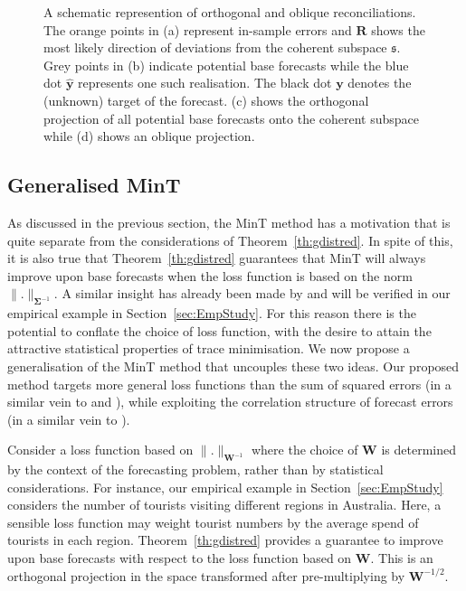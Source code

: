 \documentclass[12pt]{article}
\theoremstyle{definition}
\begin{document}
\begin{figure}[!p]
\begin{subfigure}[!h]{0.415\textwidth}
      \caption{}
  \end{subfigure}
  \caption{A schematic represention of orthogonal and oblique reconciliations. The orange points in (a) represent in-sample errors and $\bm{R}$ shows the most likely direction of deviations from the coherent subspace $\mathfrak{s}$. Grey points in (b) indicate potential base forecasts while the blue dot ${\hat{\bm y}}$ represents one such realisation. The black dot ${\bm y}$ denotes the (unknown) target of the forecast. (c) shows the orthogonal projection of all potential base forecasts onto the coherent subspace while (d) shows an oblique projection.}\label{fig:OthogonalVSOblique_projection}
\end{figure}

{\color{blue}

\subsection{Generalised MinT}

As discussed in the previous section, the MinT method has a motivation that is quite separate from the considerations of Theorem~\ref{th:gdistred}.  In spite of this, it is also true that Theorem~\ref{th:gdistred} guarantees that MinT will always improve upon base forecasts when the loss function is based on the norm $\|.\|_{\bm{\Sigma}^{-1}}$. A similar insight has already been made by \cite{VanErven2015a} and will be verified in our empirical example in Section~\ref{sec:EmpStudy}.  For this reason there is the potential to conflate the choice of loss function, with the desire to attain the attractive statistical properties of trace minimisation.  We now propose a generalisation of the MinT method that uncouples these two ideas.  Our proposed method targets more general loss functions than the sum of squared errors (in a similar vein to \cite{VanErven2015a} and \cite{NysEtAl2019}), while exploiting the correlation structure of forecast errors (in a similar vein to \cite{WicEtAl2019}).

Consider a loss function based on $\|.\|_{\bm{W}^{-1}}$ where the choice of $\bm{W}$ is determined by the context of the forecasting problem, rather than by statistical considerations.  For instance, our empirical example in Section~\ref{sec:EmpStudy} considers the number of tourists visiting different regions in Australia. Here, a sensible loss function may weight tourist numbers by the average spend of tourists in each region.  Theorem~\ref{th:gdistred} provides a guarantee to improve upon base forecasts with respect to the loss function based on $\bm{W}$.  This is an orthogonal projection in the space transformed after pre-multiplying by ${\bm W}^{-1/2}$. 

}
\end{document}
